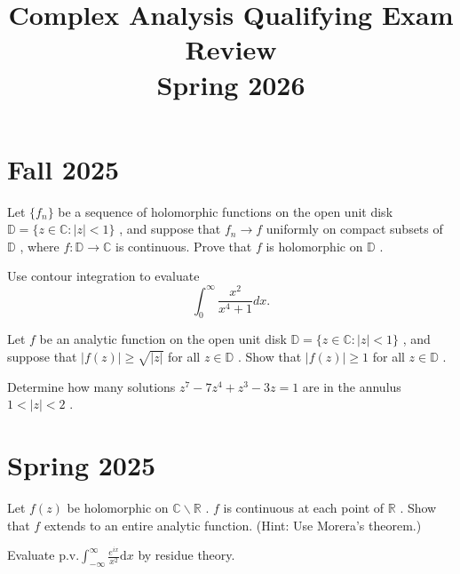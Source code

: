 \documentclass[openany]{book}
\begin{document}
\title{Complex Analysis Qualifying Exam Review
\\ 
\vspace{0.4cm}
\large Spring 2026}







\chapter{Fall 2025}

\begin{prob}
Let \(\{f_{n}\}\) be a sequence of holomorphic functions on the open unit disk \(\mathbb{D} = \{z \in \mathbb{C}: |z| < 1\}\) , and suppose that \(f_{n} \to f\) uniformly on compact subsets of \(\mathbb{D}\) , where \(f: \mathbb{D} \to \mathbb{C}\) is continuous. Prove that \(f\) is holomorphic on \(\mathbb{D}\) .
\end{prob}


\begin{prob}
Use contour integration to evaluate
\[\int_{0}^{\infty}\frac{x^{2}}{x^{4} + 1} dx.\]
\end{prob}

\begin{prob}
Let \(f\) be an analytic function on the open unit disk \(\mathbb{D} = \{z\in \mathbb{C}:|z|< 1\}\) , and suppose that \(|f(z)|\geq \sqrt{|z|}\) for all \(z\in \mathbb{D}\) . Show that \(|f(z)|\geq 1\) for all \(z\in \mathbb{D}\) .
\end{prob}

\begin{prob}
Determine how many solutions \(z^{7} - 7z^{4} + z^{3} - 3z = 1\) are in the annulus \(1< |z|< 2\) .
\end{prob}



\chapter{Spring 2025}
\begin{prob}
Let \(f(z)\) be holomorphic on \(\mathbb{C}\backslash \mathbb{R}\) . \(f\) is continuous at each point of \(\mathbb{R}\) . Show that \(f\) extends to an entire analytic function. (Hint: Use Morera's theorem.)
\end{prob}

\begin{prob}
Evaluate \(\mathrm{p.v.}\int_{-\infty}^{\infty}\frac{e^{ix}}{x^{2}}\mathrm{d}x\) by residue theory.
\end{prob}
\end{document}
